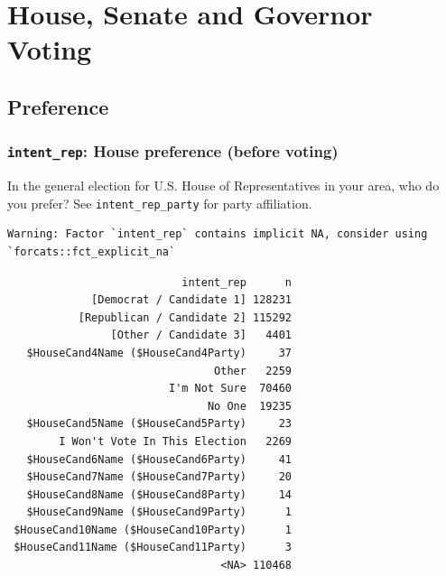 \documentclass[10pt,article,oneside]{memoir}
\theoremstyle{definition}
\begin{document}
\hypertarget{house-senate-and-governor-voting}{%
\section{House, Senate and Governor
Voting}\label{house-senate-and-governor-voting}}

\hypertarget{preference}{%
\subsection{Preference}\label{preference}}

\hypertarget{intent_rep-house-preference-before-voting}{%
\subsubsection{\texorpdfstring{\texttt{intent\_rep}: House preference
(before
voting)}{intent\_rep: House preference (before voting)}}\label{intent_rep-house-preference-before-voting}}

In the general election for U.S. House of Representatives in your area,
who do you prefer? See \texttt{intent\_rep\_party} for party
affiliation.

\begin{verbatim}
Warning: Factor `intent_rep` contains implicit NA, consider using
`forcats::fct_explicit_na`
\end{verbatim}

\begin{verbatim}
                           intent_rep      n
             [Democrat / Candidate 1] 128231
           [Republican / Candidate 2] 115292
                [Other / Candidate 3]   4401
   $HouseCand4Name ($HouseCand4Party)     37
                                Other   2259
                         I'm Not Sure  70460
                               No One  19235
   $HouseCand5Name ($HouseCand5Party)     23
        I Won't Vote In This Election   2269
   $HouseCand6Name ($HouseCand6Party)     41
   $HouseCand7Name ($HouseCand7Party)     20
   $HouseCand8Name ($HouseCand8Party)     14
   $HouseCand9Name ($HouseCand9Party)      1
 $HouseCand10Name ($HouseCand10Party)      1
 $HouseCand11Name ($HouseCand11Party)      3
                                 <NA> 110468
\end{verbatim}
\end{document}
